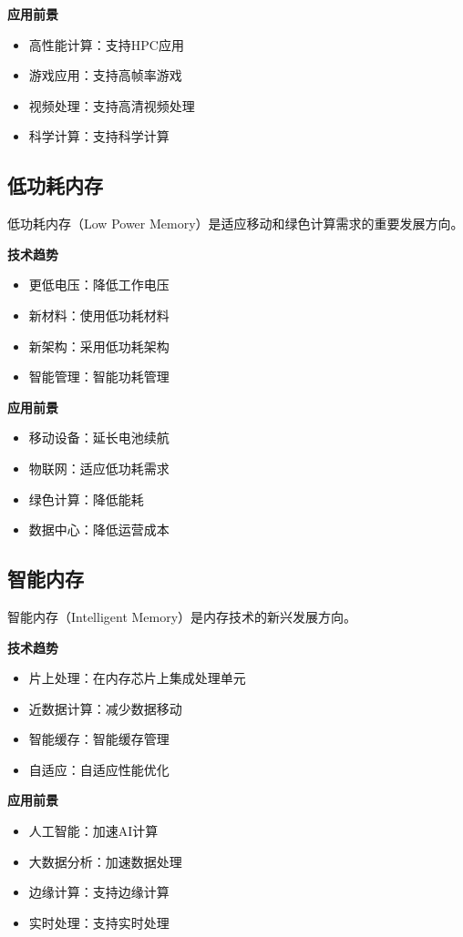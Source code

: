 \documentclass{article}
\begin{document}
\textbf{应用前景}
\begin{itemize}
    \item 高性能计算：支持HPC应用
    \item 游戏应用：支持高帧率游戏
    \item 视频处理：支持高清视频处理
    \item 科学计算：支持科学计算
\end{itemize}

\subsection{低功耗内存}

低功耗内存（Low Power Memory）是适应移动和绿色计算需求的重要发展方向。

\textbf{技术趋势}
\begin{itemize}
    \item 更低电压：降低工作电压
    \item 新材料：使用低功耗材料
    \item 新架构：采用低功耗架构
    \item 智能管理：智能功耗管理
\end{itemize}

\textbf{应用前景}
\begin{itemize}
    \item 移动设备：延长电池续航
    \item 物联网：适应低功耗需求
    \item 绿色计算：降低能耗
    \item 数据中心：降低运营成本
\end{itemize}

\subsection{智能内存}

智能内存（Intelligent Memory）是内存技术的新兴发展方向。

\textbf{技术趋势}
\begin{itemize}
    \item 片上处理：在内存芯片上集成处理单元
    \item 近数据计算：减少数据移动
    \item 智能缓存：智能缓存管理
    \item 自适应：自适应性能优化
\end{itemize}

\textbf{应用前景}
\begin{itemize}
    \item 人工智能：加速AI计算
    \item 大数据分析：加速数据处理
    \item 边缘计算：支持边缘计算
    \item 实时处理：支持实时处理
\end{itemize}
\end{document}
